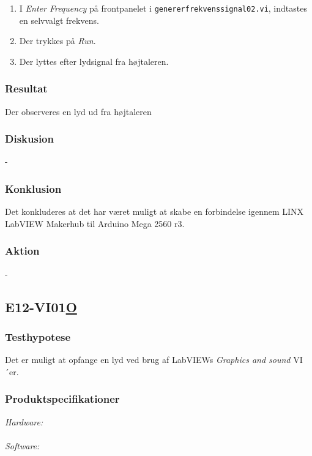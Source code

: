 \begin{enumerate}
				\item I \textit{Enter Frequency} på frontpanelet i \texttt{genererfrekvenssignal02.vi}, indtastes en selvvalgt frekvens. 
				\item Der trykkes på \textit{Run}. 
				\item Der lyttes efter lydsignal fra højtaleren.  
			\end{enumerate}

\subsubsection{Resultat}

Der observeres en lyd ud fra højtaleren

\subsubsection{Diskusion}
-
\subsubsection{Konklusion}

Det konkluderes at det har været muligt at skabe en forbindelse  
igennem LINX LabVIEW Makerhub til Arduino Mega 2560 r3.
\subsubsection{Aktion}
-



\subsection{E12-VI01\underline{O}}
\subsubsection{Testhypotese}
Det er muligt at opfange en lyd ved brug af LabVIEWs \textit{Graphics and sound} VI´er. 
\subsubsection{Produktspecifikationer}

		\textit{Hardware:}\\
		\PC\\
	
		\textit{Software:}\\
		\labview\\

